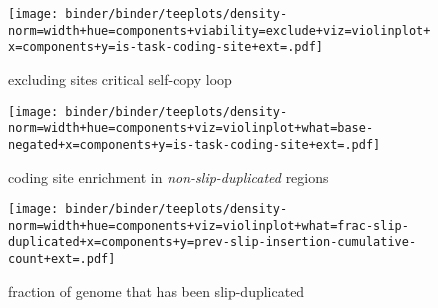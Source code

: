\begin{figure*}

\begin{subfigure}{0.5\textwidth}
\texttt{[image: binder/binder/teeplots/density-norm=width+hue=components+viability=exclude+viz=violinplot+x=components+y=is-task-coding-site+ext=.pdf]}
\caption{%
\footnotesize
excluding sites critical self-copy loop
}
\label{fig:potentiation-supp:excluding-copy-loop}
\end{subfigure}%
\begin{subfigure}{0.5\textwidth}
\texttt{[image: binder/binder/teeplots/density-norm=width+hue=components+viz=violinplot+what=base-negated+x=components+y=is-task-coding-site+ext=.pdf]}
\caption{%
\footnotesize
coding site enrichment in \textit{non-slip-duplicated} regions
}
\label{fig:potentiation-supp:non-slip-dup}
\end{subfigure}

\begin{subfigure}{0.5\textwidth}
\texttt{[image: binder/binder/teeplots/density-norm=width+hue=components+viz=violinplot+what=frac-slip-duplicated+x=components+y=prev-slip-insertion-cumulative-count+ext=.pdf]}
\caption{%
\footnotesize
fraction of genome that has been slip-duplicated
}
\label{fig:potentiation-supp:frac-slip-dup}
\end{subfigure}


\end{figure*}
